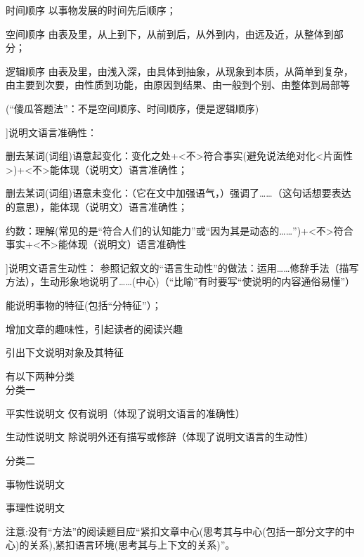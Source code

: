 \begin{compactdesc}
\item[时间顺序]以事物发展的时间先后顺序；
\item[空间顺序]由表及里，从上到下，从前到后，从外到内，由远及近，从整体到部分；
\item[逻辑顺序]由表及里，由浅入深，由具体到抽象，从现象到本质，从简单到复杂，由主要到次要，由性质到功能，由原因到结果、由一般到个别、由整体到局部等
\end{compactdesc}
(``傻瓜答题法''：不是空间顺序、时间顺序，便是逻辑顺序)

\hatsubsubsection[\hatx[6]{2}{2011-06-14}]{说明文语言准确性：}
\begin{asparaenum}[(1)]
\item 删去某词(词组)语意起变化：变化之处+<不>符合事实(避免说法绝对化<片面性>)+<不>能体现（说明文）语言准确性；
\item 删去某词(词组)语意未变化：（它在文中加强语气，）强调了\ldots{}\ldots{}（这句话想要表达的意思），能体现（说明文）语言准确性；
\item 约数：理解(常见的是``符合人们的认知能力''或``因为其是动态的\ldots{}\ldots{}'')+<不>符合事实+<不>能体现（说明文）语言准确性
\end{asparaenum}
\hatsubsubsection[\hatb[6]{2}{2011-05-26}]{说明文语言生动性：}
参照记叙文的``语言生动性''的做法：运用\ldots{}\ldots{}修辞手法（描写方法），生动形象地说明了\ldots{}\ldots{}(中心)（``比喻''有时要写``使说明的内容通俗易懂''）
\begin{asparaenum}[(1)]
\item 能说明事物的特征(包括``分特征''）；
\item 增加文章的趣味性，引起读者的阅读兴趣
\item 引出下文说明对象及其特征
\end{asparaenum}

有以下两种分类
\\分类一
\begin{compactdesc}
\item[平实性说明文]仅有说明（体现了说明文语言的准确性）
\item[生动性说明文]除说明外还有描写或修辞（体现了说明文语言的生动性）
\end{compactdesc}
分类二
\begin{compactdesc}
\item[事物性说明文]
\item[事理性说明文]
\end{compactdesc}

注意:没有``方法''的阅读题目应``紧扣文章中心(思考其与中心(包括一部分文字的中心)的关系),紧扣语言环境(思考其与上下文的关系)''。
\label{main}
